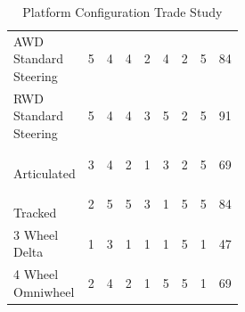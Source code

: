 \documentclass{article}
\begin{document}
\begin{table}[H]
\begin{adjustwidth}{-1in}{-1in}
\begin{tabular}{|l|c|c|c|c|c|c|c|c|}
		\makecell[l]{AWD \\ Standard \\ Steering}                                 & 5     & 4                & 4         & 2                   & 4                 & 2                                          & 5                             & 84    \\ \hdashline
		\makecell[l]{RWD \\ Standard \\ Steering}                                 & 5     & 4                & 4         & 3                   & 5                 & 2                                          & 5                             & 91    \\ \hdashline
		\makecell[l]{ \\ Articulated \\ \quad }                                   & 3     & 4                & 2         & 1                   & 3                 & 2                                          & 5                             & 69    \\ \hdashline
		\makecell[l]{\\ Tracked  \\ \quad}                                        & 2     & 5                & 5         & 3                   & 1                 & 5                                          & 5                             & 84    \\ \hdashline
		\makecell[l]{3 Wheel \\ Delta}                                            & 1     & 3                & 1         & 1                   & 1                 & 5                                          & 1                             & 47    \\ \hdashline
		\makecell[l]{4 Wheel \\ Omniwheel}                                        & 2     & 4                & 2         & 1                   & 5                 & 5                                          & 1                             & 69    \\ \hline
		\end{tabular}
		\caption{Platform Configuration Trade Study}
		\label{my-label}
		\end{adjustwidth}
		\end{table}
		
\end{document}
